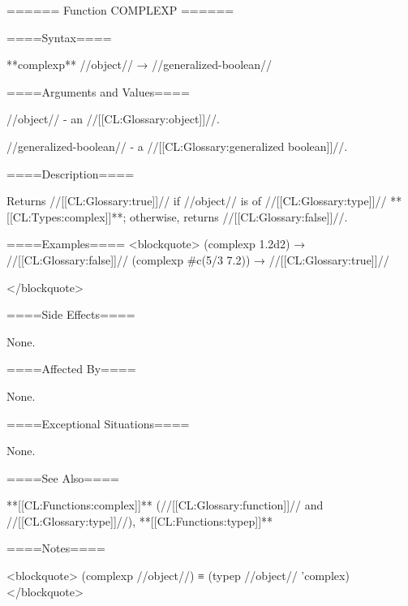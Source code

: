 ====== Function COMPLEXP ======

====Syntax====

**complexp** //object// → //generalized-boolean//

====Arguments and Values====

//object// - an //[[CL:Glossary:object]]//.

//generalized-boolean// - a //[[CL:Glossary:generalized boolean]]//.

====Description====

Returns //[[CL:Glossary:true]]// if //object// is of //[[CL:Glossary:type]]// **[[CL:Types:complex]]**; otherwise, returns //[[CL:Glossary:false]]//.

====Examples==== <blockquote> (complexp 1.2d2) → //[[CL:Glossary:false]]// (complexp #c(5/3 7.2)) → //[[CL:Glossary:true]]//

</blockquote>

====Side Effects====

None.

====Affected By====

None.

====Exceptional Situations====

None.

====See Also====

**[[CL:Functions:complex]]** (//[[CL:Glossary:function]]// and //[[CL:Glossary:type]]//), **[[CL:Functions:typep]]**

====Notes====

<blockquote> (complexp //object//) ≡ (typep //object// 'complex) </blockquote>

